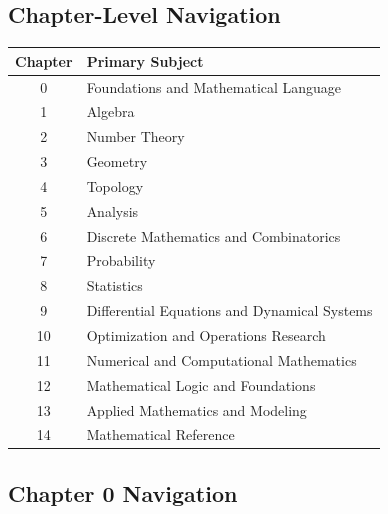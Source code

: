 \subsection{Chapter-Level Navigation}
\label{subsec:master-index-chapter-navigation}

\begin{center}
\begin{tabular}{c|l}
\textbf{Chapter}
&
\textbf{Primary Subject}
\\ \hline

0
&
Foundations and Mathematical Language
\\

1
&
Algebra
\\

2
&
Number Theory
\\

3
&
Geometry
\\

4
&
Topology
\\

5
&
Analysis
\\

6
&
Discrete Mathematics and Combinatorics
\\

7
&
Probability
\\

8
&
Statistics
\\

9
&
Differential Equations and Dynamical Systems
\\

10
&
Optimization and Operations Research
\\

11
&
Numerical and Computational Mathematics
\\

12
&
Mathematical Logic and Foundations
\\

13
&
Applied Mathematics and Modeling
\\

14
&
Mathematical Reference
\end{tabular}
\end{center}

\subsection{Chapter 0 Navigation}
\label{subsec:index-chapter-zero}

